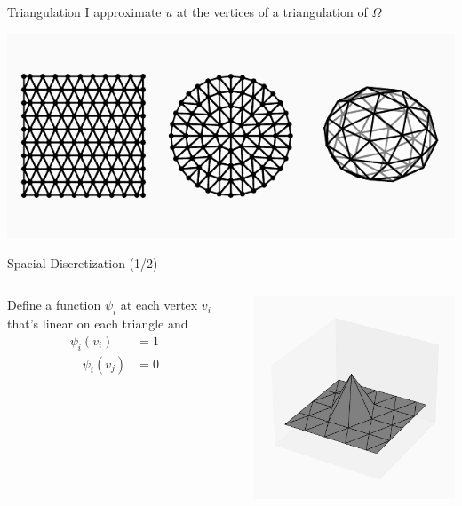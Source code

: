 \documentclass{beamer}
\begin{document}
\begin{frame}{Triangulation}
    I approximate $u$ at the vertices of a \alert{triangulation} of $\Omega$
    \begin{center}
        \includegraphics{figures/tris.pdf}
    \end{center}
\end{frame}

\begin{frame}{Spacial Discretization (1/2)}
    \begin{columns}
        \begin{column}{0.4\textwidth}
            Define a function $\psi_i$ at each vertex $v_i$ that's linear on each triangle and
            \begin{align*}
                \psi_i(v_i) &= 1 \quad \\
                \quad \psi_i (v_j) &= 0
            \end{align*}
        \end{column}

        \begin{column}{0.6\textwidth}
            \centering
            \includegraphics{figures/psi.pdf}
        \end{column}
    \end{columns}
\end{frame}
\end{document}
